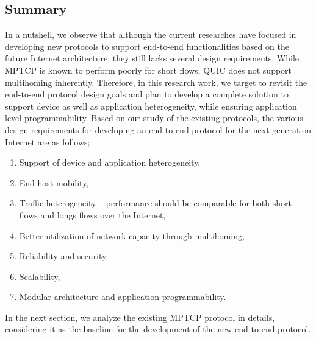 \subsection{Summary}

In a nutshell, we observe that although the current researches have focused in developing new protocols to support end-to-end functionalities based on the future Internet architecture, they still lacks several design requirements. While MPTCP is known to perform poorly for short flows, QUIC does not support multihoming inherently. Therefore, in this research work, we target to revisit the end-to-end protocol design goals and plan to develop a complete solution to support device as well as application heterogeneity, while ensuring application level programmability. Based on our study of the existing protocols, the various design requirements for developing an end-to-end protocol for the next generation Internet are as follows;
\begin{enumerate}
	\item Support of device and application heterogeneity,
	\item End-host mobility, 
	\item Traffic heterogeneity -- performance should be comparable for both short flows and longs flows over the Internet,
	\item Better utilization of network capacity through multihoming,
	\item Reliability and security,
	\item Scalability,  
	\item Modular architecture and application programmability.
\end{enumerate}  
In the next section, we analyze the existing MPTCP protocol in details, considering it as the baseline for the development of the new end-to-end protocol. 